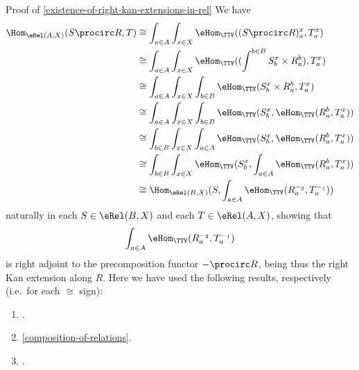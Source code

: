 \begin{Proof}{Proof of \cref{existence-of-right-kan-extensions-in-rel}}%
    We have
    \begingroup\small
    \begin{align*}
        \Hom_{\eRel(A,X)}(S\procirc R,T) &\cong  \int_{a\in A}\int_{x\in X}\eHom_{\TTV}((S\procirc R)^{x}_{a},T^{x}_{a})\\
                                         &\cong  \int_{a\in A}\int_{x\in X}\eHom_{\TTV}((\int^{b\in B}S^{x}_{b}\times R^{b}_{a}),T^{x}_{a})\\
                                         &\cong  \int_{a\in A}\int_{x\in X}\int_{b\in B}\eHom_{\TTV}(S^{x}_{b}\times R^{b}_{a},T^{x}_{a})\\
                                         &\cong  \int_{a\in A}\int_{x\in X}\int_{b\in B}\eHom_{\TTV}(S^{x}_{b},\eHom_{\TTV}(R^{b}_{a},T^{x}_{a}))\\
                                         &\cong  \int_{b\in B}\int_{x\in X}\int_{a\in A}\eHom_{\TTV}(S^{x}_{b},\eHom_{\TTV}(R^{b}_{a},T^{x}_{a}))\\
                                         &\cong  \int_{b\in B}\int_{x\in X}\eHom_{\TTV}(S^{x}_{b},\int_{a\in A}\eHom_{\TTV}(R^{b}_{a},T^{x}_{a}))\\
                                         &\cong  \Hom_{\eRel(B,X)}(S,\int_{a\in A}\eHom_{\TTV}(R^{-_{2}}_{a},T^{-_{1}}_{a}))%
    \end{align*}
    \endgroup
    naturally in each $S\in\eRel(B,X)$ and each $T\in\eRel(A,X)$, showing that
    \[
        \int_{a\in A}\eHom_{\TTV}(R^{-_{2}}_{a},T^{-_{1}}_{a})%
    \]%
    is right adjoint to the precomposition functor $-\procirc R$, being thus the right Kan extension along $R$. Here we have used the following results, respectively (i.e.\ for each $\cong$ sign):
    \begin{enumerate}%
        \item {}.
        \item \cref{composition-of-relations}.
        \item {}.

\end{enumerate}
\end{Proof}
